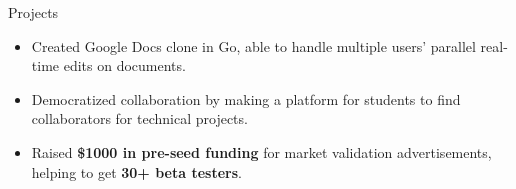 \documentclass{resume} %
\begin{document}
\begin{workSection}{Projects}
	
	\customItem[
	title=Ashdocs (in progress),
	technologies= | Go(Golang){,} Websockets,
	]
	\begin{itemize}
		\vspace{-0.5em}
		\itemsep -6pt {}
		\item Created Google Docs clone in {Go}, able to handle multiple users' parallel real-time edits on documents.
	\end{itemize}
	
	\customItem[
	title=\href{https://github.com/AshkanArabim/hackerhunt}{hackerhunt.tech \faExternalLink},
	technologies= | Django{,} React{,} TypeScript{,} Nginx{,} Docker{,} AWS SES,
	duration=%
	]
	\begin{itemize}
		\vspace{-0.5em}
		\itemsep -6pt {}
		\item Democratized collaboration by making a platform for students to find collaborators for technical projects. 
		\item Raised \textbf{\$1000 in pre-seed funding} for market validation advertisements, helping to get \textbf{30+ beta testers}. %
	\end{itemize}
	

\end{workSection}
\end{document}
